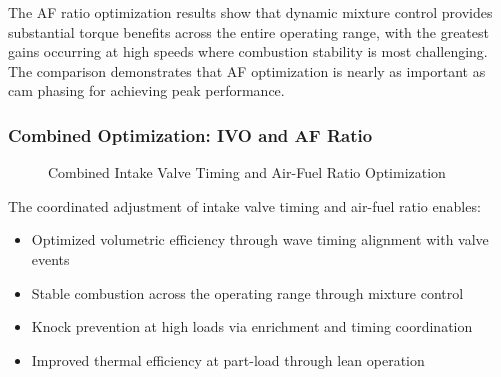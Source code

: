 The AF ratio optimization results show that dynamic mixture control provides substantial torque benefits across the entire operating range, with the greatest gains occurring at high speeds where combustion stability is most challenging. The comparison demonstrates that AF optimization is nearly as important as cam phasing for achieving peak performance.

\subsubsection{Combined Optimization: IVO and AF Ratio}

\begin{figure}[H]
    \centering
    \caption{Combined Intake Valve Timing and Air-Fuel Ratio Optimization}
    \label{fig:task2_ivo_af_combined}
\end{figure}

The coordinated adjustment of intake valve timing and air-fuel ratio enables:
\begin{itemize}
    \item Optimized volumetric efficiency through wave timing alignment with valve events
    \item Stable combustion across the operating range through mixture control
    \item Knock prevention at high loads via enrichment and timing coordination
    \item Improved thermal efficiency at part-load through lean operation
\end{itemize}

